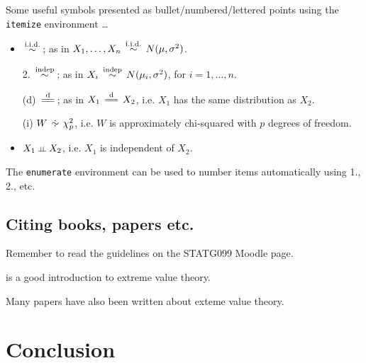 \documentclass[a4paper,12pt,titlepage]{article} %
\numberwithin{equation}{section}  %
\begin{document}
\def\dperp{ \mathrel{\kern0pt\vbox{\hbox to 0.8em{\hss
\setbox0=\hbox{$\shortparallel$}\dp0=0pt\box0\hss}\hrule width 0.8em}}}

Some useful symbols presented as  bullet/numbered/lettered points using the \verb!itemize! environment \ldots
\begin{itemize}
\item $\,\stackrel{{\rm\tiny i.i.d.}}{\sim}\,$; as in $X_1,\ldots,X_n \,\stackrel{{\rm\tiny i.i.d.}}{\sim}\, N(\mu,\sigma^2)$.
\item [2.] $\,\stackrel{{\rm\tiny indep}}{\sim}\,$; as in $X_i \,\stackrel{{\rm\tiny indep}}{\sim}\, N(\mu_i,\sigma^2)$, for $i=1,\ldots,n$.
\item [(d)] $\,\stackrel{{\rm\tiny d}}{=\!=}\,$; as in $X_1 \,\stackrel{{\rm\tiny d}}{=\!=}\, X_2$, i.e. $X_1$ has the same distribution as $X_2$.
\item [(i)] $W \approxd \chi^2_p$, i.e. $W$ is approximately chi-squared with $p$ degrees of freedom.
\item $X_1 \dperp X_2$, i.e. $X_1$ is independent of $X_2$.
\end{itemize}
The \verb!enumerate! environment can be used to number items automatically using 1., 2., etc.

\subsection{Citing books, papers etc.}
\label{sec:refs}
Remember to read the guidelines on the STATG099 Moodle page.

\citet{Coles2001} is a good introduction to extreme value theory.

Many papers \citep{BCT2000} have also been written about exteme value theory.

\section{Conclusion}

\end{document}
